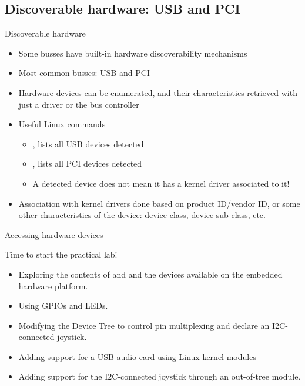 \subsection{Discoverable hardware: USB and PCI}

\begin{frame}{Discoverable hardware}
  \begin{itemize}
  \item Some busses have built-in hardware discoverability mechanisms
  \item Most common busses: USB and PCI
  \item Hardware devices can be enumerated, and their characteristics
    retrieved with just a driver or the bus controller
  \item Useful Linux commands
    \begin{itemize}
    \item {}, lists all USB devices detected
    \item {}, lists all PCI devices detected
    \item A detected device does not mean it has a kernel driver
      associated to it!
    \end{itemize}
  \item Association with kernel drivers done based on product
    ID/vendor ID, or some other characteristics of the device: device
    class, device sub-class, etc.
  \end{itemize}
\end{frame}

\setuplabframe
{Accessing hardware devices}
{
  Time to start the practical lab!
  \begin{itemize}
  \item Exploring the contents of  and  and the
    devices available on the embedded hardware platform.
  \item Using GPIOs and LEDs.
  \item Modifying the Device Tree to control pin multiplexing and
        declare an I2C-connected joystick.
  \item Adding support for a USB audio card using Linux kernel modules
  \item Adding support for the I2C-connected joystick through
        an out-of-tree module.
  \end{itemize}
}
